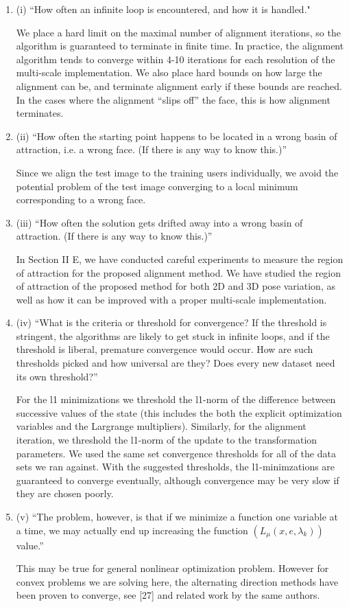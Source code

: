 \documentclass[11pt]{article}
\begin{document}
\begin{enumerate}
\item (i) ``How often an infinite loop is encountered, and how it is handled."

We place a hard limit on the maximal number of alignment iterations, so the
algorithm is guaranteed to terminate in finite time.  In practice, the
alignment algorithm tends to converge within 4-10 iterations for each
resolution of the multi-scale implementation.  We also place hard bounds on how
large the alignment can be, and terminate alignment early if these bounds are
reached.  In the cases where the alignment ``slips off'' the face, this is how
alignment terminates.  

\item (ii) ``How often the starting point happens to be located in a wrong basin of
attraction, i.e. a wrong face. (If there is any way to know this.)''

Since we align the test image to the training users individually, we avoid the
potential problem of the test image converging to a local minimum corresponding
to a wrong face.

\item (iii) ``How often the solution gets drifted away into a wrong basin of
attraction. (If there is any way to know this.)''

In Section II E, we have conducted careful experiments to measure the region of attraction
for the proposed alignment method. We have studied the region of attraction of the proposed
method for both 2D and 3D pose variation, as well as how it can be improved with a proper
multi-scale implementation. 

\item (iv) ``What is the criteria or threshold for convergence? If the threshold is
stringent, the algorithms are likely to get stuck in infinite loops, and if the
threshold is liberal, premature convergence would occur. How are such
thresholds picked and how universal are they? Does every new dataset need its
own threshold?''

For the l1 minimizations we threshold the l1-norm of the difference between
successive values of the state (this includes the both the explicit
optimization variables and the Largrange multipliers).  Similarly, for the
alignment iteration, we threshold the l1-norm of the update to the
transformation parameters.  We used the same set convergence thresholds for all
of the data sets we ran against.  With the suggested thresholds, the l1-minimzations are
guaranteed to converge eventually, although convergence may be very slow if they
are chosen poorly.  

\item (v) ``The problem, however, is that if we minimize a function one variable at
a time, we may actually end up increasing the function $(L_{\mu}(x,e,\lambda_{k}))$ value.''

This may be true for general nonlinear optimization problem. However for convex problems
we are solving here, the alternating direction methods have been proven to converge, see
[27] and related work by the same authors. 


\end{enumerate}
\end{document}
